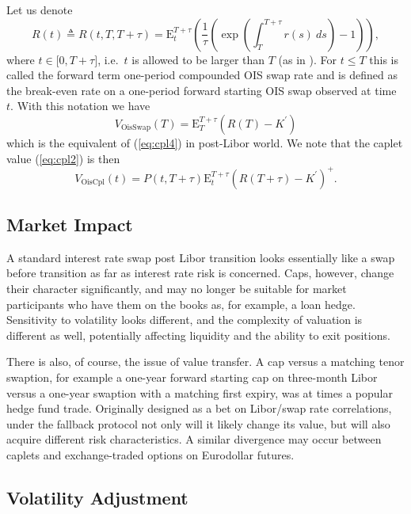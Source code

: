 \documentclass{article}
\begin{document}
Let us denote 
\begin{equation}
R(t)\triangleq R(t,T,T+\tau )=\mathrm{E}_{t}^{T+\tau }\left( \frac{1}{\tau }%
\left( \exp \left( \int_{T}^{T+\tau }r(s)~ds\right) -1\right) \right) ,
\label{eq:termois1}
\end{equation}%
where $t\in \lbrack 0,T+\tau ]$, i.e.~$t$ is allowed to be larger than $T$
(as in \cite{lyas-merc-l}). For $t\leq T$ this is called the forward term
one-period compounded OIS swap rate and is defined as the break-even rate on
a one-period forward starting OIS swap observed at time $t.$ With this
notation we have%
\begin{equation*}
V_{\mathrm{OisSwap}}(T)=\mathrm{E}_{T}^{T+\tau }\left( R(T)-K^{\prime
}\right)
\end{equation*}%
which is the equivalent of (\ref{eq:cpl4}) in post-Libor world. We note that
the caplet value (\ref{eq:cpl2}) is then%
\begin{equation*}
V_{\mathrm{OisCpl}}(t)=P(t,T+\tau )\mathrm{E}_{t}^{T+\tau }\left( R(T+\tau
)-K^{\prime }\right) ^{+}.
\end{equation*}

\subsection{Market Impact}

A standard interest rate swap post Libor transition looks essentially like a
swap before transition as far as interest rate risk is concerned. Caps,
however, change their character significantly, and may no longer be suitable
for market participants who have them on the books as, for example, a loan
hedge. Sensitivity to volatility looks different, and the complexity of
valuation is different as well, potentially affecting liquidity and the
ability to exit positions.

There is also, of course, the issue of value transfer. A cap versus a
matching tenor swaption, for example a one-year forward starting cap on
three-month Libor versus a one-year swaption with a matching first expiry,
was at times a popular hedge fund trade. Originally designed as a bet on
Libor/swap rate correlations, under the fallback protocol not only will it
likely change its value, but will also acquire different risk
characteristics. A similar divergence may occur between caplets and
exchange-traded options on Eurodollar futures.

\subsection{Volatility Adjustment}
\end{document}

